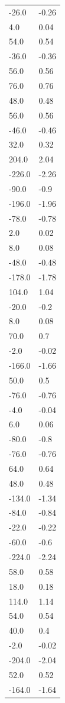 \begin{longtable}{ll}
-26.0 & -0.26 \\
4.0 & 0.04 \\
54.0 & 0.54 \\
-36.0 & -0.36 \\
56.0 & 0.56 \\
76.0 & 0.76 \\
48.0 & 0.48 \\
56.0 & 0.56 \\
-46.0 & -0.46 \\
32.0 & 0.32 \\
204.0 & 2.04 \\
-226.0 & -2.26 \\
-90.0 & -0.9 \\
-196.0 & -1.96 \\
-78.0 & -0.78 \\
2.0 & 0.02 \\
8.0 & 0.08 \\
-48.0 & -0.48 \\
-178.0 & -1.78 \\
104.0 & 1.04 \\
-20.0 & -0.2 \\
8.0 & 0.08 \\
70.0 & 0.7 \\
-2.0 & -0.02 \\
-166.0 & -1.66 \\
50.0 & 0.5 \\
-76.0 & -0.76 \\
-4.0 & -0.04 \\
6.0 & 0.06 \\
-80.0 & -0.8 \\
-76.0 & -0.76 \\
64.0 & 0.64 \\
48.0 & 0.48 \\
-134.0 & -1.34 \\
-84.0 & -0.84 \\
-22.0 & -0.22 \\
-60.0 & -0.6 \\
-224.0 & -2.24 \\
58.0 & 0.58 \\
18.0 & 0.18 \\
114.0 & 1.14 \\
54.0 & 0.54 \\
40.0 & 0.4 \\
-2.0 & -0.02 \\
-204.0 & -2.04 \\
52.0 & 0.52 \\
-164.0 & -1.64 \\

\end{longtable}

